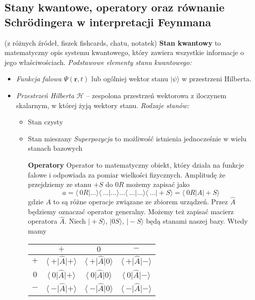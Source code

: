 \subsection{Stany kwantowe, operatory oraz równanie Schrödingera w interpretacji Feynmana}
(z różnych źródeł, fiszek fishcards, chatu, notatek)
\textbf{Stan kwantowy} to matematyczny opis systemu kwantowego, który zawiera wszystkie informacje o jego właściwościach.  
\textit{Podstawowe elementy stanu kwantowego:}
\begin{itemize}
  \item \textit{Funkcja falowa} \(\Psi(\mathbf{r},t)\) lub ogólniej wektor stanu \(\lvert \psi \rangle\) w przestrzeni Hilberta.
  \item \textit{Przestrzeń Hilberta} \(\mathcal{H}\) – zespolona przestrzeń wektorowa z iloczynem skalarnym, w której żyją wektory stanu.
\textit{Rodzaje stanów:}
\begin{itemize}
  \item{Stan czysty} 
  \item{Stan mieszany} 
  \textit{Superpozycja} to możliwość istnienia jednocześnie w wielu stanach bazowych 
  
\textbf{Operatory}
Operator to matematyczny obiekt, który działa na funkcje falowe i odpowiada za pomiar wielkości fizycznych.
Amplitudę że przejdziemy ze stanu $+S$ do $0R$ możemy zapisać jako
\begin{equation*}
	a = \langle\ 0R \vert \dots \rangle \langle\ \dots \vert \dots \rangle \dots \langle\ \dots \vert \dots \rangle \langle\ \dots \vert +S \rangle  = \langle\ 0R \vert A \vert +S \rangle 
\end{equation*}
gdzie $A$ to są różne operacje związane ze zbiorem urządzeń. Przez $\hat{A}$ będziemy oznaczać operator generalny.
Możemy też zapisać macierz operatora $\hat{A}$. Niech $\vert +S \rangle$, $\vert 0S \rangle$, $\vert -S \rangle$ będą stanami naszej bazy. Wtedy mamy
\begin{table}[ht]
	\centering
	\begin{tabular}[t]{c|c|c|c}
		& $+$ & $0$ & $-$\\
		\hline
		$+$ & $\langle\ + \vert \hat{A} \vert + \rangle $ & $\langle\ + \vert \hat{A} \vert 0 \rangle $ & $\langle\ + \vert \hat{A} \vert - \rangle $ \\
		\hline
		$0$ & $\langle\ 0 \vert \hat{A} \vert + \rangle $ & $\langle\ 0 \vert \hat{A} \vert 0 \rangle $ & $\langle\ 0 \vert \hat{A} \vert - \rangle $ \\
		\hline
		$-$ & $\langle\ - \vert \hat{A} \vert + \rangle $ & $\langle\ - \vert \hat{A} \vert 0 \rangle $ & $\langle\ - \vert \hat{A} \vert - \rangle $ \\
	\end{tabular}
	\label{tab:macierzoperatora}
\end{table}


\end{itemize}
\end{itemize}
